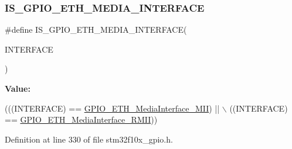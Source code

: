 \subsubsection{\texorpdfstring{I\+S\+\_\+\+G\+P\+I\+O\+\_\+\+E\+T\+H\+\_\+\+M\+E\+D\+I\+A\+\_\+\+I\+N\+T\+E\+R\+F\+A\+CE}{IS\_GPIO\_ETH\_MEDIA\_INTERFACE}}
{\footnotesize\ttfamily \#define I\+S\+\_\+\+G\+P\+I\+O\+\_\+\+E\+T\+H\+\_\+\+M\+E\+D\+I\+A\+\_\+\+I\+N\+T\+E\+R\+F\+A\+CE(\begin{DoxyParamCaption}\item[{}]{I\+N\+T\+E\+R\+F\+A\+CE }\end{DoxyParamCaption})}

{\bfseries Value\+:}
\begin{DoxyCode}
(((INTERFACE) == \hyperlink{group___ethernet___media___interface_gae11ff25c61c4f22f55118f9f88f6d465}{GPIO\_ETH\_MediaInterface\_MII}) || \(\backslash\)
                                                ((INTERFACE) == 
      \hyperlink{group___ethernet___media___interface_ga5ee3d057ee58149b1d1abdacfacd4a4e}{GPIO\_ETH\_MediaInterface\_RMII}))
\end{DoxyCode}


Definition at line 330 of file stm32f10x\+\_\+gpio.\+h.

